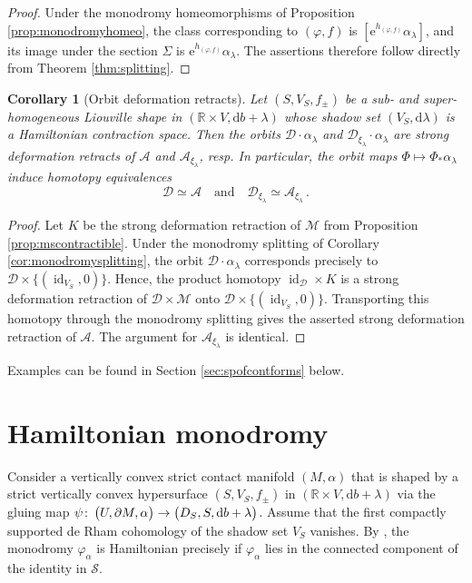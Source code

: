 \documentclass{amsart}
\newtheorem{cor}[prop]{Corollary}
\theoremstyle{definition}
\def\co{\colon\thinspace}
\newcommand{\AAA}{\mathcal A}
\newcommand{\rmd}{\mathrm d}
\newcommand{\DD}{\mathcal D}
\newcommand{\rme}{\mathrm e}
\newcommand{\MM}{\mathcal M}
\newcommand{\R}{\mathbb R}
\renewcommand{\SS}{\mathcal S}
\newcommand{\ra}{\rightarrow}
\DeclareMathOperator{\id}{\mathrm{id}}
\begin{document}
\begin{proof}
Under the monodromy homeomorphisms of
Proposition \ref{prop:monodromyhomeo},
the class corresponding to $(\varphi,f)$ is
$[\rme^{h_{(\varphi,f)}}\alpha_{\lambda}]$,
and its image under the section $\Sigma$
is $\rme^{h_{(\varphi,f)}}\alpha_{\lambda}$.
The assertions therefore follow directly from
Theorem \ref{thm:splitting}.
\end{proof}


\begin{cor}[Orbit deformation retracts]
\label{cor:orbitdeformationretracts}
Let $(S,V_S,f_{\pm})$ be a sub- and super-homogeneous
Liouville shape in $(\R\times V,\rmd b+\lambda)$
whose shadow set $(V_S,\rmd\lambda)$
is a Hamiltonian contraction space.
Then the orbits
$\DD\cdot\alpha_{\lambda}$ and
$\DD_{\xi_{\lambda}}\cdot\alpha_{\lambda}$
are strong deformation retracts of
$\AAA$ and $\AAA_{\xi_{\lambda}}$, resp.
In particular, the orbit maps
$\Phi\mapsto\Phi_*\alpha_{\lambda}$
induce homotopy equivalences
  \[
  \DD\simeq\AAA
  \quad\text{and}\quad
  \DD_{\xi_{\lambda}}\!\simeq\AAA_{\xi_{\lambda}}
  \,.
  \]
\end{cor}


\begin{proof}
Let $K$ be the strong deformation retraction of $\MM$
from Proposition \ref{prop:mscontractible}.
Under the monodromy splitting of
Corollary \ref{cor:monodromysplitting},
the orbit $\DD\cdot\alpha_{\lambda}$
corresponds precisely to
$\DD\times\{(\id_{V_S},0)\}$.
Hence, the product homotopy
$\id_{\DD}\times K$
is a strong deformation retraction of
$\DD\times\MM$ onto
$\DD\times\{(\id_{V_S},0)\}$.
Transporting this homotopy through the
monodromy splitting gives the asserted
strong deformation retraction of $\AAA$.
The argument for $\AAA_{\xi_{\lambda}}$
is identical.
\end{proof}


Examples can be found
in Section \ref{sec:spofcontforms} below.




\section{Hamiltonian monodromy}
\label{sec:hammonodrom}


Consider a vertically convex strict contact manifold $(M,\alpha)$
that is shaped by a strict vertically convex hypersurface
$(S,V_S,f_{\pm})$ in $(\R\times V,\rmd b+\lambda)$
via the gluing map
$\psi\co\big(U,\partial M,\alpha\big)\ra
\big(D_S,S,\rmd b+\lambda\big)$.
Assume that the first compactly supported de Rham cohomology
of the shadow set $V_S$ vanishes.
By \cite[Proposition~9.3.1]{mcdsal17},
the monodromy $\varphi_{\alpha}$ is Hamiltonian
precisely if $\varphi_{\alpha}$ lies in the connected component
of the identity in $\SS$.
\end{document}
